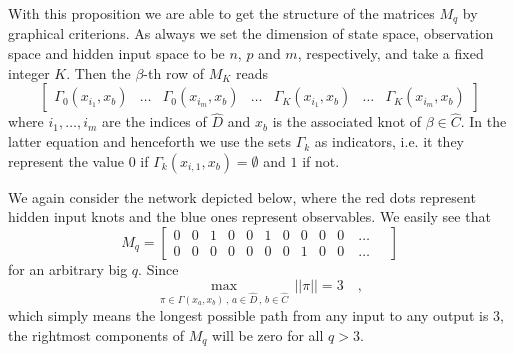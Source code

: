 With this proposition we are able to get the structure of the matrices $M_q$ by graphical criterions. As always 
we set the dimension of state space, observation space and hidden input space to be $n$, $p$ and $m$, 
respectively, and take a fixed integer $K$. Then the $\beta$-th row of $M_K$ reads
\begin{equation}
	\begin{bmatrix}
	\Gamma_0(x_{i_1},x_b) & \ldots &  \Gamma_0(x_{i_m},x_b)  & \dots  &
 	\Gamma_K(x_{i_1},x_b) & \ldots &  \Gamma_K(x_{i_m},x_b) 
	\end{bmatrix} \label{eq:M_q_beta}
\end{equation}
where $i_1,\ldots,i_m$ are the indices of $\hat{D}$ and $x_b$ is the associated knot of $\beta\in\hat{C}$. 
In the latter equation and henceforth we use the sets $\Gamma_k$ as 
indicators, i.e. it they represent the value $0$ if $\Gamma_k(x_{i,1},x_b)=\emptyset$ and $1$ if not.
\begin{example}{}{}
	We again consider the network depicted below, where the red dots represent hidden input knots and the blue 
	ones represent observables.
	We easily see that
	\begin{equation}
	M_q = \begin{bmatrix}
	0 & 0 &   1 & 0 &  0 & 1 &  0 & 0 & 0 & 0  \quad \dots \quad \\
	0 & 0 &   0 & 0 &  0 & 0 &  0 & 1 & 0 & 0  \quad \dots \quad 
	\end{bmatrix}
	\end{equation}
	for an arbitrary big $q$. Since 
	\begin{equation}
	\max\limits_{\pi \in \Gamma(x_a,x_b)\, ,\,a\in \hat{D}\, ,\,b\in\hat{C}} \, ||\pi|| = 3 
	\quad ,
	\end{equation}
	which simply means the longest possible path from any input to any output is $3$, the rightmost components 
	of $M_q$ will be zero for all $q>3$.
		
\end{example}